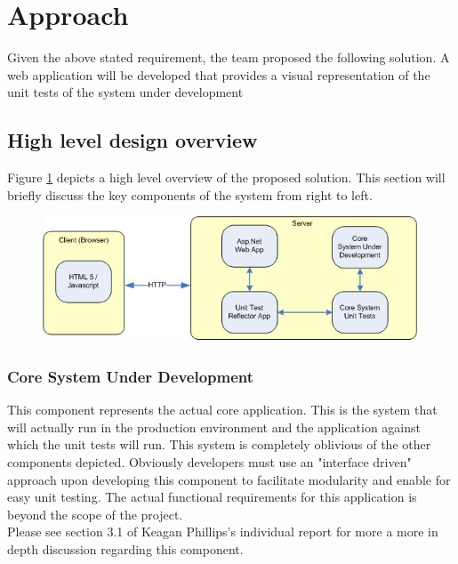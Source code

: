 \documentclass[a4paper,12pt]{Article}
\begin{document}
\section{Approach}
Given the above stated requirement, the team proposed the following solution. A web application will be developed that provides a visual representation of the unit tests of the system under development

\subsection{High level design overview}
Figure \ref{fig1} depicts a high level overview of the proposed solution. This section will briefly discuss the key components of the system from right to left.

\begin{center}
	\begin{figure}
		\includegraphics{system_overview.JPG}
			\caption{}
			\label{fig1}    
	\end{figure}	
\end{center}

\subsubsection{Core System Under Development}
This component represents the actual core application. This is the system that will actually run in the production environment and the application against which the unit tests will run. This system is completely oblivious of the other components depicted. Obviously developers must use an "interface driven" approach upon developing this component to facilitate modularity and enable for easy unit testing. The actual functional requirements for this application is beyond the scope of the project.\\
\linebreak
Please see section 3.1 of Keagan Phillips's individual report\cite{reportKeagan} for more a more in depth discussion regarding this component. 
\end{document}
